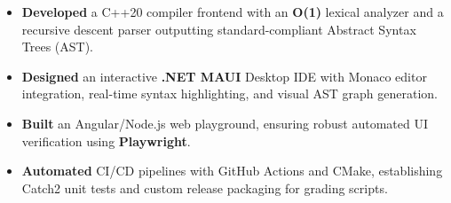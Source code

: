 \noindent
{}
\begin{itemize}
    \item \textbf{Developed} a C++20 compiler frontend with an \textbf{O(1)} lexical analyzer and a recursive descent parser outputting standard-compliant Abstract Syntax Trees (AST).
    \item \textbf{Designed} an interactive \textbf{.NET MAUI} Desktop IDE with Monaco editor integration, real-time syntax highlighting, and visual AST graph generation.
    \item \textbf{Built} an Angular/Node.js web playground, ensuring robust automated UI verification using \textbf{Playwright}.
    \item \textbf{Automated} CI/CD pipelines with GitHub Actions and CMake, establishing Catch2 unit tests and custom release packaging for grading scripts.
\end{itemize}